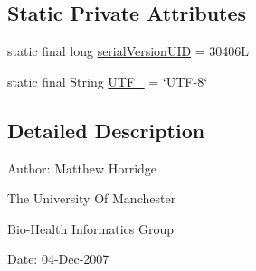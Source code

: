 \subsection*{Static Private Attributes}
\begin{DoxyCompactItemize}
\item 
static final long \hyperlink{classorg_1_1semanticweb_1_1owlapi_1_1util_1_1_abstract_o_w_l_ontology_storer_a69875e527a6d6961412b8464ad102086}{serial\-Version\-U\-I\-D} = 30406\-L
\item 
static final String \hyperlink{classorg_1_1semanticweb_1_1owlapi_1_1util_1_1_abstract_o_w_l_ontology_storer_a783a9f7be00945c4dc263789f0cdae16}{U\-T\-F\-\_} = \char`\"{}U\-T\-F-\/8\char`\"{}
\end{DoxyCompactItemize}


\subsection{Detailed Description}
Author\-: Matthew Horridge\par
 The University Of Manchester\par
 Bio-\/\-Health Informatics Group\par
 Date\-: 04-\/\-Dec-\/2007\par
 \par
 

